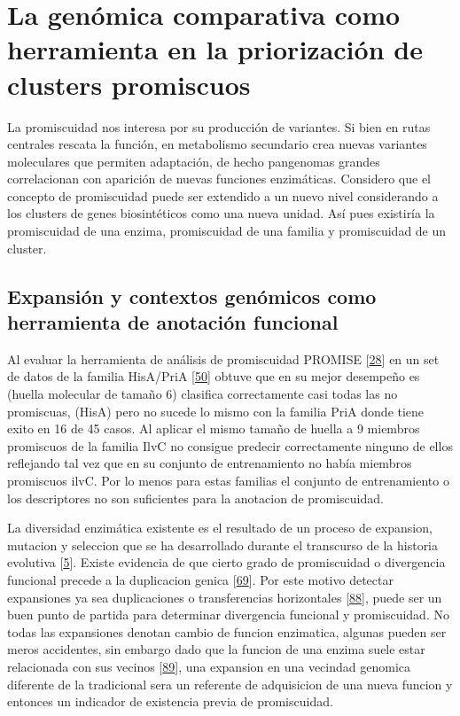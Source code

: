 \documentclass[12pt,twoside]{reedthesis}
\begin{document}
  \section{La genómica comparativa como herramienta en la priorización de
  clusters
  promiscuos}\label{la-genomica-comparativa-como-herramienta-en-la-priorizacion-de-clusters-promiscuos}
  
  La promiscuidad nos interesa por su producción de variantes. Si bien en
  rutas centrales rescata la función, en metabolismo secundario crea
  nuevas variantes moleculares que permiten adaptación, de hecho
  pangenomas grandes correlacionan con aparición de nuevas funciones
  enzimáticas. Considero que el concepto de promiscuidad puede ser
  extendido a un nuevo nivel considerando a los clusters de genes
  biosintéticos como una nueva unidad. Así pues existiría la promiscuidad
  de una enzima, promiscuidad de una familia y promiscuidad de un cluster.
  
  \subsection{Expansión y contextos genómicos como herramienta de
  anotación
  funcional}\label{expansion-y-contextos-genomicos-como-herramienta-de-anotacion-funcional}
  
  Al evaluar la herramienta de análisis de promiscuidad PROMISE
  {[}\protect\hyperlink{ref-carbonell_molecular_2010}{28}{]} en un set de
  datos de la familia HisA/PriA
  {[}\protect\hyperlink{ref-noda-garcia_insights_2015}{50}{]} obtuve que
  en su mejor desempeño es (huella molecular de tamaño 6) clasifica
  correctamente casi todas las no promiscuas, (HisA) pero no sucede lo
  mismo con la familia PriA donde tiene exito en 16 de 45 casos. Al
  aplicar el mismo tamaño de huella a 9 miembros promiscuos de la familia
  IlvC no consigue predecir correctamente ninguno de ellos reflejando tal
  vez que en su conjunto de entrenamiento no había miembros promiscuos
  ilvC. Por lo menos para estas familias el conjunto de entrenamiento o
  los descriptores no son suficientes para la anotacion de promiscuidad.
  
  La diversidad enzimática existente es el resultado de un proceso de
  expansion, mutacion y seleccion que se ha desarrollado durante el
  transcurso de la historia evolutiva
  {[}\protect\hyperlink{ref-khersonsky_enzyme_2010}{5}{]}. Existe
  evidencia de que cierto grado de promiscuidad o divergencia funcional
  precede a la duplicacion genica
  {[}\protect\hyperlink{ref-hughes_evolution_1994}{69}{]}. Por este motivo
  detectar expansiones ya sea duplicaciones o transferencias horizontales
  {[}\protect\hyperlink{ref-treangen_horizontal_2011}{88}{]}, puede ser un
  buen punto de partida para determinar divergencia funcional y
  promiscuidad. No todas las expansiones denotan cambio de funcion
  enzimatica, algunas pueden ser meros accidentes, sin embargo dado que la
  funcion de una enzima suele estar relacionada con sus vecinos
  {[}\protect\hyperlink{ref-overbeek_use_1999}{89}{]}, una expansion en
  una vecindad genomica diferente de la tradicional sera un referente de
  adquisicion de una nueva funcion y entonces un indicador de existencia
  previa de promiscuidad.
  
\end{document}
